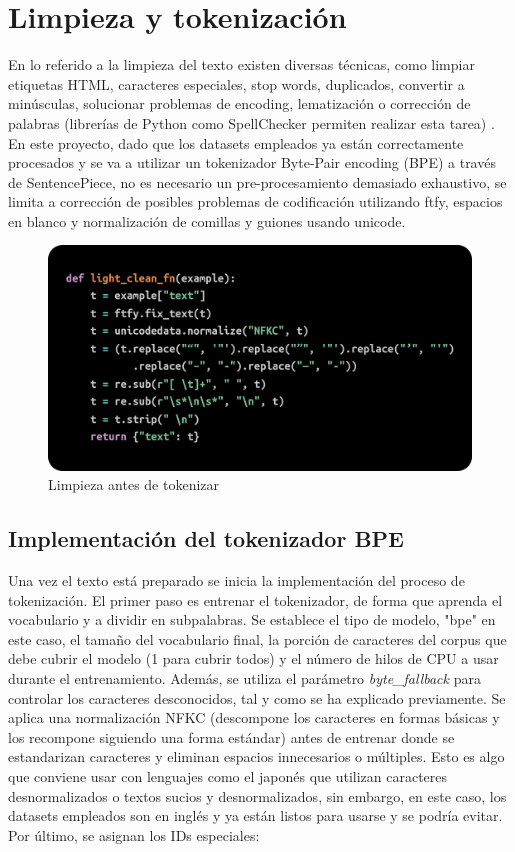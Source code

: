 \documentclass[11pt]{book}
\begin{document}

\section{Limpieza y tokenización}

En lo referido a la limpieza del texto existen diversas técnicas, como limpiar etiquetas HTML, caracteres especiales, stop words, duplicados, convertir a minúsculas, solucionar problemas de encoding, lematización o corrección de palabras (librerías de Python como SpellChecker permiten realizar esta tarea) \parencite{shabbir2021cleaning}. En este proyecto, dado que los datasets empleados ya están correctamente procesados y se va a utilizar un tokenizador Byte-Pair encoding (BPE) a través de SentencePiece, no es necesario un pre-procesamiento demasiado exhaustivo, se limita a corrección de posibles problemas de codificación utilizando ftfy, espacios en blanco y normalización de comillas y guiones usando unicode.

\begin{figure}[h]
    \centering
    \includegraphics[width=0.5\linewidth]{img/preclean.png}
    \caption{Limpieza antes de tokenizar}
    \label{fig:placeholder2}
\end{figure}

\subsection{Implementación del tokenizador BPE}
Una vez el texto está preparado se inicia la implementación del proceso de tokenización. El primer paso es entrenar el tokenizador, de forma que aprenda el vocabulario y a dividir en subpalabras. Se establece el tipo de modelo, "bpe" en este caso, el tamaño del vocabulario final, la porción de caracteres del corpus que debe cubrir el modelo (1 para cubrir todos) y el número de hilos de CPU a usar durante el entrenamiento. Además, se utiliza el parámetro \textit{byte\_fallback} para controlar los caracteres desconocidos, tal y como se ha explicado previamente. Se aplica una normalización NFKC (descompone los caracteres en formas básicas y los recompone siguiendo una forma estándar) antes de entrenar donde se estandarizan caracteres y eliminan espacios innecesarios o múltiples. Esto es algo que conviene usar con lenguajes como el japonés que utilizan caracteres desnormalizados o textos sucios y desnormalizados, sin embargo, en este caso, los datasets empleados son en inglés y ya están listos para usarse y se podría evitar. Por último, se asignan los IDs especiales:
\end{document}
